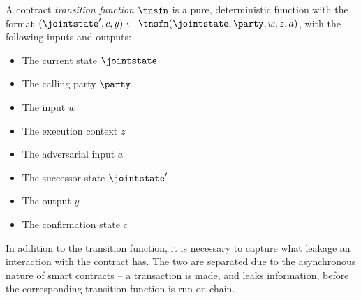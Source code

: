 A contract \emph{transition function} $\tnsfn$ is a pure, deterministic
function with the format $(\jointstate', c, y) \gets \tnsfn(\jointstate, \party, w, z, a)$, with the
following inputs and outputs:
\vspace{-1em}
\begin{multicols}{2}
\begin{itemize}
  \item The current state $\jointstate$
  \item The calling party $\party$
  \item The input $w$
  \item The execution context $z$
  \item The adversarial input $a$
  \item The successor state $\jointstate'$
  \item The output $y$
  \item The confirmation state $c$
\end{itemize}
\end{multicols}
\vspace{-1em}

In addition to the transition function, it is necessary to capture what leakage
an interaction with the contract has. The two are separated due to the
asynchronous nature of smart contracts -- a transaction is made, and leaks
information, before the corresponding transition function is run on-chain.


